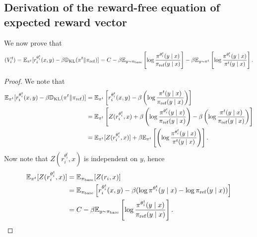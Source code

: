 \subsection{Derivation of the reward-free equation of expected reward vector}\label{app:expected reward vector derivation}
We now prove that 
\begin{align*}
    (V^t_i) = \mathbb{E}_{\pi^t}[r_i^{\theta_i^t}(x,y) - \beta\mathbb{D}_{\mathrm{KL}}(\pi^t\| \pi_{\mathrm{ref}})] = C-\beta \mathbb{E}_{y\sim \pi_{\mathrm{base}}}\left[\log \frac{\pi^{\theta_i^t}(y\mid x)}{\pi_{\mathrm{ref}}(y\mid x)}\right] - \beta \mathbb{E}_{y\sim \pi^t}\left[\log \frac{\pi^{\theta_i^t}(y\mid x)}{\pi^t(y\mid x)}\right].
\end{align*}
\begin{proof}
We note that 
\begin{align*}
    \mathbb{E}_{\pi^t}[r_i^{\theta_i^t}(x,y) - \beta\mathbb{D}_{\mathrm{KL}}(\pi^t\| \pi_{\mathrm{ref}})] &= \mathbb{E}_{\pi^t}\left[r_i^{\theta_i^t}(x,y) - \beta \left(\log\frac{\pi^t(y\mid x)}{\pi_{\mathrm{ref}}(y\mid x)}\right)\right]\\
    &=\mathbb{E}_{\pi^t}\left[Z(r_i^{\theta_i^t},x)  + \beta\left(\log\frac{\pi^{\theta_i^t}(y\mid x)}{\pi_{\mathrm{ref}}(y\mid x)}\right) - \beta\left(\log\frac{\pi^t(y\mid x)}{\pi_{\mathrm{ref}}(y\mid x)}\right)\right]\\
    &=\mathbb{E}_{\pi^t}[Z(r_i^{\theta_i^t},x)] +\beta \mathbb{E}_{\pi^t}\left[\left(\log\frac{\pi^{\theta_i^t}(y\mid x)}{\pi^t(y\mid x)}\right)\right].
\end{align*}
Now note that $Z(r_i^{\theta_i^t},x)$ is independent on $y$, hence 
\begin{align*}
    \mathbb{E}_{\pi^t}[Z(r_i^{\theta_i^t},x)] &=\mathbb{E}_{\pi_{\mathrm{base}}}[Z(r_i,x)]\\
    &=\mathbb{E}_{\pi_{\mathrm{base}}}\left[r_i^{\theta_i^t}(x,y) - \beta (\log \pi^{\theta_i^t}(y\mid x) - \log \pi_{\mathrm{ref}}(y\mid x))\right]\\
    &=C - \beta \mathbb{E}_{y\sim \pi_{\mathrm{base}}}\left[\log \frac{\pi^{\theta_i^t}(y\mid x)}{\pi_{\mathrm{ref}}(y\mid x)}\right]. 
\end{align*}
\end{proof}
